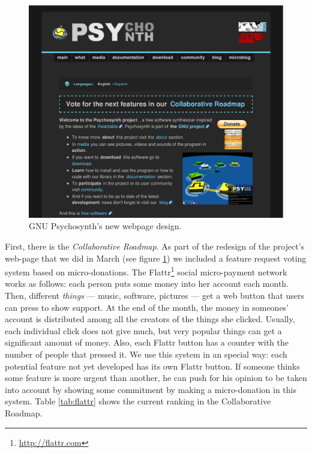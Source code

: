 \begin{figure}[h!]
  \centering
  \includegraphics[width=\textwidth]{pic/webpage.pdf}
  \caption{GNU Psychosynth's new webpage design.}
  \label{fig:webpage}
\end{figure}

First, there is the \emph{Collaborative
  Roadmap}. As part of the redesign of the project's web-page that we
did in March (see figure \ref{fig:webpage}) we included a feature
request voting system based on micro-donations. The
Flattr\footnote{\url{http://flattr.com}} social
micro-payment network works as follows: each person puts some money
into her account each month. Then, different \emph{things} --- music,
software, pictures --- get a web button that users can press to show
support. At the end of the month, the money in someones' account is
distributed among all the creators of the things she clicked. Usually,
each individual click does not give much, but very popular things can
get a significant amount of money. Also, each Flattr button has a
counter with the number of people that pressed it. We use this system
in an special way: each potential feature not yet developed has its
own Flattr button. If someone thinks some feature is more urgent than
another, he can push for his opinion to be taken into account by
showing some commitment by making a micro-donation in this
system. Table \ref{tab:flattr} shows the current ranking in the
Collaborative Roadmap.

